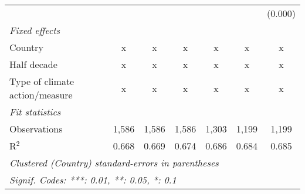 \begin{tabular}{lcccccc}
                                                       &         &         &                &                &                & (0.000)\\   
   \emph{Fixed effects}\\
   Country                                             & x       & x       & x              & x              & x              & x\\  
   Half decade                                         & x       & x       & x              & x              & x              & x\\  
   Type of climate action/measure                      & x       & x       & x              & x              & x              & x\\  
   \midrule \emph{Fit statistics}\\
   Observations                                        & 1,586   & 1,586   & 1,586          & 1,303          & 1,199          & 1,199\\  
   R$^2$                                               & 0.668   & 0.669   & 0.674          & 0.686          & 0.684          & 0.685\\  
   \midrule
   \multicolumn{7}{l}{\emph{Clustered (Country) standard-errors in parentheses}}\\
   \multicolumn{7}{l}{\emph{Signif. Codes: ***: 0.01, **: 0.05, *: 0.1}}\\
\end{tabular}
\par\endgroup


